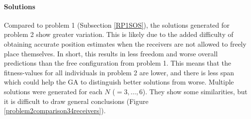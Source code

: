 \documentclass[10pt,a4paper]{book}
\begin{document}
\paragraph{Solutions}
\label{RP2SOS}

Compared to problem 1 (Subsection \ref{RP1SOS}), the solutions generated for problem 2 show greater variation. This is likely due to the added difficulty of obtaining accurate position estimates when the receivers are not allowed to freely place themselves. In short, this results in less freedom and worse overall predictions than the free configuration from problem 1. This means that the fitness-values for all individuals in problem 2 are lower, and there is less span which could help the \gls{GA} to distinguish better solutions from worse. Multiple solutions were generated for each $N$ ($ = 3,\ldots,6$). They show some similarities, but it is difficult to draw general conclusions (Figure \ref{problem2comparison34receivers}).
\end{document}
